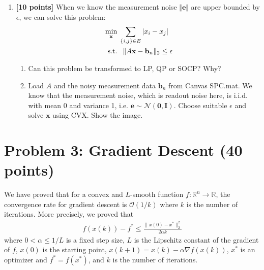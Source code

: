 \documentclass{article}
\newcommand{\bb}{\mathbf{b}}
\newcommand{\bx}{\mathbf{x}}
\newcommand{\be}{\mathbf{e}}
\newcommand{\bI}{\mathbf{I}}
\begin{document}
\begin{enumerate}
	\begin{enumerate}
    	\item Can this problem be transformed to LP, QP or SOCP? Why?
	\begin{tcolorbox}
	\end{tcolorbox}
        \item Load $A$ and the noisy measurement data $\bb_n$ from Canvas SPC.mat, choose 
        $\lambda \in \{ 0.1, 1, 10, 100\}$ and solve $\bx$ using CVX. Show images with all $\lambda$s.
        \begin{tcolorbox}
	\end{tcolorbox}
    \end{enumerate}
    
\item \textbf{[10 points]} When we know the measurement noise $\Vert \mathbf{e}\Vert $ are upper bounded by $\epsilon$, we can solve this problem:
\begin{equation}\label{}
\begin{split}
&\min_\bx  \; \sum_{\{i,j\} \in E}|x_i - x_{j}|  \\
&\text{ \,s.t.\,\, } \| A\bx - \bb_n \|_2 \leq \epsilon
\end{split}
\end{equation}

\begin{enumerate}
    	\item Can this problem be transformed to LP, QP or SOCP? Why? 
	\begin{tcolorbox}
	\end{tcolorbox}
        \item Load $A$ and the noisy measurement data $\bb_n$ from Canvas SPC.mat. We know that the measurement noise, which is readout noise here, is i.i.d. with mean 0 and variance 1, i.e. $\be \sim \mathcal{N}(\mathbf{0}, \bI)$.
Choose suitable $\epsilon$ and solve $\bx$ using CVX. Show the image.
\begin{tcolorbox}
	\end{tcolorbox}
    \end{enumerate}

\end{enumerate}

\newpage
\section*{Problem 3: Gradient Descent (40 points)}
We have proved that for a convex and $L$-smooth function
$f:\mathbb{R}^n \rightarrow \mathbb{R}$, the
convergence rate for gradient descent is $\mathcal{O}(1/k)$ where $k$ is
the number of iterations.
More precisely, we proved that
\begin{align}
	f(x(k)) - f^* \le \frac{\|x(0) - x^*\|^2_2}{2\alpha k}
\end{align}
where $0 < \alpha \leq 1/L$ is a fixed step size, $L$ is the Lipschitz
constant of the gradient of $f$, $x(0)$ is the starting point, $x(k+1) = x(k) - \alpha \nabla f(x(k))$,
$x^*$ is an optimizer and $f^* = f(x^*)$, and
$k$ is the number of iterations. 
\end{document}
